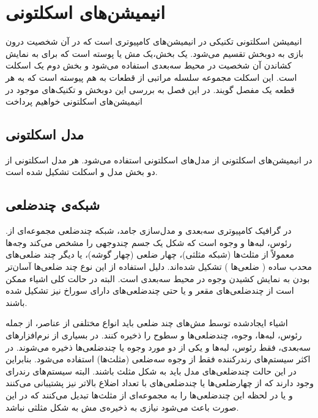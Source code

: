 \chapter { انیمیشن‌های اسکلتونی }


انیمیشن‌ اسکلتونی تکنیکی در انیمیشن‌های کامپیوتری است که در آن شخصیت درون بازی به دوبخش تقسیم ‌می‌شود. یک بخش،یک مش یا پوسته است که برای به نمایش کشاندن ‌آن شخصیت در محیط سه‌بعدی استفاده می‌شود و بخش دوم یک اسکلت است. این اسکلت مجموعه سلسله مراتبی از قطعات به‌ هم پیوسته است که به هر قطعه یک مفصل گویند.
در این فصل به بررسی این دوبخش و تکنیک‌های موجود در انیمیشن‌های اسکلتونی خواهیم پرداخت

\section{مدل اسکلتونی}

در انیمیشن‌های اسکلتونی از مدل‌های اسکلتونی استفاده می‌شود. هر مدل اسکلتونی از دو بخش مدل و اسکلت تشکیل شده است. 

\section{شبکه‌ی\protect{} چندضلعی}

.در گرافیک کامپیوتری سه‌بعدی و مدل‌سازی جامد، شبکه چند‌ضلعی مجموعه‌ای از رئوس، لبه‌ها و وجوه است که شکل یک جسم چند‌وجهی را مشخص می‌کند
وجه‌ها معمولاً از مثلث‌ها (شبکه مثلثی)، چهار ضلعی (چهار گوشه)، یا دیگر چند ضلعی‌های محدب ساده
(
	ضلعی‌ها
)
تشکیل شده‌اند. دلیل استفاده از این نوع چند ضلعی‌ها آسان‌تر بودن به نمایش کشیدن وجوه در محیط سه‌بعدی است.
البته در حالت کلی اشیاء ممکن است از چندضلعی‌های مقعر و یا حتی چندضلعی‌های دارای سوراخ نیز تشکیل شده باشند.

اشیاء ایجادشده توسط مش‌های چند ضلعی باید انواع مختلفی از عناصر، از جمله رئوس، لبه‌ها، وجوه، چندضلعی‌ها و سطوح را ذخیره کنند.
در بسیاری از نرم‌افزارهای سه‌بعدی، فقط رئوس، لبه‌ها و یکی از دو مورد وجوه یا چند‌ضلعی‌ها ذخیره می‌شوند.
در اکثر سیستم‌های رندرکننده
فقط از وجوه سه‌ضلعی
(مثلث‌ها)
استفاده‌ می‌شود.
بنابراین در این حالت چند‌ضلعی‌های مدل باید به شکل مثلث باشند. البته سیستم‌های رندرای وجود دارند که از چهارضلعی‌ها یا چندضلعی‌های با تعداد اضلاع بالاتر نیز پشتیبانی ‌می‌کنند و یا در لحظه این چندضلعی‌ها را به مجموعه‌ای از مثلث‌ها تبدیل می‌کنند که در این صورت باعث ‌می‌شود نیازی به ذخیره‌ی مش به شکل مثلثی نباشد.

